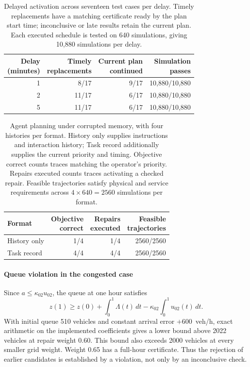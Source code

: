 \documentclass[final]{cas-sc}
\theoremstyle{definition}
\theoremstyle{plain}
\theoremstyle{definition}
\theoremstyle{plain}
\begin{document}
\begin{table}[pos=!htb]
\centering\small
\caption{Delayed activation across seventeen test cases per delay. Timely
replacements have a matching certificate ready by the plan start time; inconclusive
or late results retain the current plan. Each executed schedule is tested
on 640 simulations, giving 10,880 simulations per delay.}
\label{tab:activation-delay-results}
\begin{tabular}{@{}rrrr@{}}
\toprule
\shortstack{Delay\\(minutes)} & \shortstack{Timely\\replacements} &
\shortstack{Current plan\\continued} & \shortstack{Simulation\\passes}\\
\midrule
1 & 8/17 & 9/17 & 10,880/10,880\\
2 & 11/17 & 6/17 & 10,880/10,880\\
5 & 11/17 & 6/17 & 10,880/10,880\\
\bottomrule
\end{tabular}
\end{table}

\begin{table}[pos=!htb]
\centering\small
\caption{Agent planning under corrupted memory, with four histories per
format. History only supplies instructions and interaction history; Task
record additionally supplies the current priority and timing. Objective
correct counts traces matching the operator's priority. Repairs executed
counts traces activating a checked repair. Feasible trajectories satisfy
physical and service requirements across $4\times640=2560$ simulations
per format.}
\label{tab:benchmark-api-execution}
\begin{tabularx}{\linewidth}{@{}Xrrr@{}}
\toprule
Format & \shortstack{Objective\\correct} & \shortstack{Repairs\\executed} & \shortstack{Feasible\\trajectories}\\
\midrule
History only & 1/4 & 1/4 & 2560/2560\\
Task record & 4/4 & 4/4 & 2560/2560\\
\bottomrule
\end{tabularx}
\end{table}

\paragraph{Queue violation in the congested case}
\label{app:congested-diagnostics}
Since $a\le\kappa_{02}u_{02}$, the queue at one hour satisfies
\[
z(1)\ge z(0)+\int_0^1\Lambda(t)\,dt
             -\kappa_{02}\int_0^1u_{02}(t)\,dt.
\]
With initial queue 510 vehicles and constant arrival error
$+600$~veh/h, exact arithmetic on the implemented coefficients gives
a lower bound above 2022 vehicles at repair weight 0.60. This bound also
exceeds 2000 vehicles at every smaller grid weight. Weight 0.65
has a full-hour certificate. Thus the rejection of earlier candidates
is established by a violation, not only by an inconclusive check.
\end{document}
